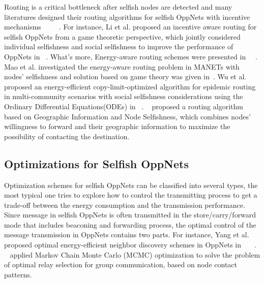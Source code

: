 Routing is a critical bottleneck after selfish nodes are detected and many literatures designed their routing algorithms for selfish OppNets with incentive mechanisms~\cite{DBLP:journals/access/WangWGFL18}~\cite{DBLP:conf/ciss/ChhabraVS17}~\cite{DBLP:conf/wcsp/LiQZC16}~\cite{DBLP:journals/tvt/CaiFW16}~\cite{DBLP:journals/tpds/ChenSY15}. 
For instance, Li et al. proposed an incentive aware routing for selfish OppNets from a game theoretic perspective, which jointly considered individual selfishness and social selfishness to improve the performance of OppNets in ~\cite{DBLP:conf/wcsp/LiQZC16}.
What's more, Energy-aware routing schemes were presented in ~\cite{DBLP:journals/monet/MaoZ15}~\cite{DBLP:conf/globecom/WuZLYP16}. Mao et al. investigated the energy-aware routing problem in MANETs with nodes' selfishness and solution based on game theory was given in~\cite{DBLP:journals/monet/MaoZ15}. Wu et al. proposed an energy-efficient copy-limit-optimized algorithm for epidemic routing in multi-community scenarios with social selfishness considerations using the Ordinary Differential Equations(ODEs) in ~\cite{DBLP:conf/globecom/WuZLYP16}. ~\cite{7914197} proposed a routing algorithm based on Geographic Information and Node Selfishness, which combines nodes' willingness to forward and their geographic information to maximize the possibility of contacting the destination.

\subsection{Optimizations for Selfish OppNets}
Optimization schemes for selfish OppNets can be classified into several types, the most typical one tries to explore how to control the transmitting process to get a trade-off between the energy consumption and the transmission performance. Since message in selfish OppNets is often transmitted in the store/carry/forward mode that includes beaconing and forwarding process, the optimal control of the message transmission in OppNets contains two parts. For instance, Yang et al. proposed optimal energy-efficient neighbor discovery schemes in OppNets in ~\cite{DBLP:conf/ccnc/YangSKK10}~\cite{DBLP:conf/percom/YangSKK09}~\cite{DBLP:journals/jcn/YangSKK15}. ~\cite{DBLP:conf/mobicom/PicuS10} applied Markov Chain Monte Carlo (MCMC) optimization to solve the problem of optimal relay selection for group communication, based on node contact patterns.
